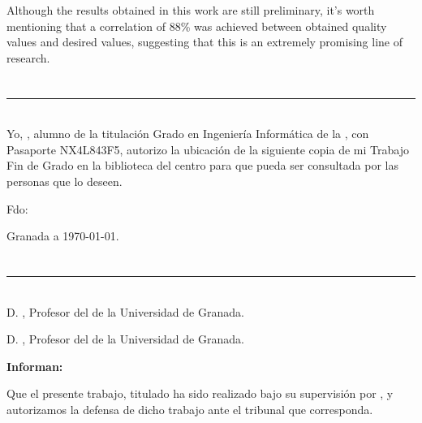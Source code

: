 Although the results obtained in this work are still preliminary, 
it's worth mentioning that a correlation of 88\% was achieved between obtained 
quality values and desired values, suggesting that this is an extremely promising 
line of research.

\chapter*{}
\thispagestyle{empty}

\noindent\rule[-1ex]{\textwidth}{2pt}\\[4.5ex]

Yo, \textbf{\myName}, alumno de la titulación Grado en Ingeniería
Informática  de la \textbf{\myFaculty}, 
con Pasaporte NX4L843F5, autorizo la ubicación de la siguiente copia de mi 
Trabajo Fin de Grado en la biblioteca del centro para que pueda ser
consultada por las personas que lo deseen.

\vspace{6cm}

\noindent Fdo: \myName

\vspace{2cm}

\begin{flushright}
Granada a \today.
\end{flushright}


\chapter*{}
\thispagestyle{empty}

\noindent\rule[-1ex]{\textwidth}{2pt}\\[4.5ex]

D. \textbf{\myProf}, Profesor del \myDepartment de la Universidad de Granada.

\vspace{0.5cm}

D. \textbf{\myOtherProf}, Profesor del \myDepartment de la Universidad de Granada.


\vspace{0.5cm}

\textbf{Informan:}

\vspace{0.5cm}

Que el presente trabajo, titulado \textit{\textbf{\myTitle}}
ha sido realizado bajo su supervisión por \textbf{\myName}, y autorizamos la defensa de dicho trabajo ante el tribunal
que corresponda.

